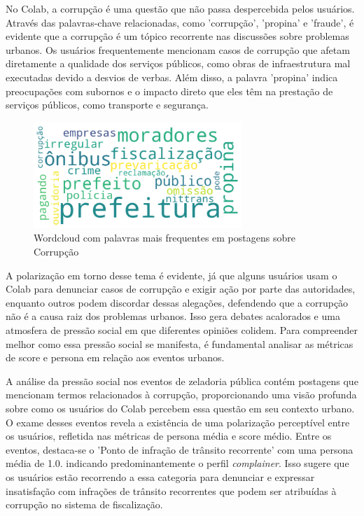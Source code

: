 No Colab, a corrupção é uma questão que não passa despercebida pelos usuários. Através das palavras-chave relacionadas, como 'corrupção', 'propina' e 'fraude', é evidente que a corrupção é um tópico recorrente nas discussões sobre problemas urbanos. Os usuários frequentemente mencionam casos de corrupção que afetam diretamente a qualidade dos serviços públicos, como obras de infraestrutura mal executadas devido a desvios de verbas. Além disso, a palavra 'propina' indica preocupações com subornos e o impacto direto que eles têm na prestação de serviços públicos, como transporte e segurança.

\begin{figure}[htb]
	\centering
	\includegraphics[width=0.7\textwidth]{images/wordcloud_corruption.png}
	\caption{Wordcloud com palavras mais frequentes em postagens sobre Corrupção}
	\label{fig:wordcloud_corruption}
\end{figure}

A polarização em torno desse tema é evidente, já que alguns usuários usam o Colab para denunciar casos de corrupção e exigir ação por parte das autoridades, enquanto outros podem discordar dessas alegações, defendendo que a corrupção não é a causa raiz dos problemas urbanos. Isso gera debates acalorados e uma atmosfera de pressão social em que diferentes opiniões colidem. Para compreender melhor como essa pressão social se manifesta, é fundamental analisar as métricas de score e persona em relação aos eventos urbanos.

A análise da pressão social nos eventos de zeladoria pública contém postagens que mencionam termos relacionados à corrupção, proporcionando uma visão profunda sobre como os usuários do Colab percebem essa questão em seu contexto urbano. O exame desses eventos revela a existência de uma polarização perceptível entre os usuários, refletida nas métricas de persona média e score médio. Entre os eventos, destaca-se o 'Ponto de infração de trânsito recorrente' com uma persona média de 1.0. indicando predominantemente o perfil \textit{complainer}. Isso sugere que os usuários estão recorrendo a essa categoria para denunciar e expressar insatisfação com infrações de trânsito recorrentes que podem ser atribuídas à corrupção no sistema de fiscalização.

